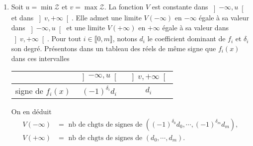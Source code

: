 \begin{enumerate}
\begin{enumerate}
  \item Quand $x$ varie de $a$ à $b$, $V(x)$ ne varie qu'en traversant une racine de $P$. Il est décrémenté de $1$ en traversant une telle racine. On en déduit
\[
  V(b) = V(a) - \text{nb racines dans } [a,b] \Rightarrow \text{nb racines dans } [a,b] = V(a) - V(b).
\]
\end{enumerate}

  \item Soit $u = \min \mathcal{Z}$ et $v = \max \mathcal{Z}$. La fonction $V$ est constante dans $\left]- \infty, u \right[$ et dans $\left] v, + \infty \right[$. Elle admet une limite $V(-\infty)$ en $-\infty$ égale à sa valeur dans $\left]- \infty, u \right[$ et une limite $V(+\infty)$ en $+\infty$ égale à sa valeur dans $\left]v ,+ \infty \right[$.\newline
  Pour tout $i \in \llbracket 0,m \rrbracket$, notons $d_i$ le coefficient dominant de $f_i$ et $\delta_i$ son degré.\newline
  Présentons dans un tableau des réels de même signe que $f_i(x)$ dans ces intervalles
\begin{center}
\renewcommand{\arraystretch}{1.5}
\begin{tabular}{|c|c|c|} \hline
                  & $\left]- \infty, u \right[$ & $\left]v ,+ \infty \right[$\\ \hline
signe de $f_i(x)$ & $(-1)^{\delta_i}d_i$        & $d_i$ \\ \hline
\end{tabular}
\end{center}
On en déduit  
\[ 
\begin{aligned}
  V(-\infty) &= \text{ nb de chgts de signes de } \left((-1)^{\delta_0}d_0, \cdots,  (-1)^{\delta_m}d_m\right), \\
  V(+\infty) &= \text{ nb de chgts de signes de } \left(d_0, \cdots,  d_m\right).
\end{aligned}
\]  


\end{enumerate}

